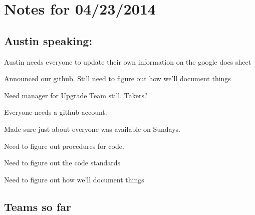 \section*{Notes for 04/23/2014}

\subsection*{Austin speaking\+:}


\begin{DoxyEnumerate}
\item Austin needs everyone to update their own information on the google docs sheet
\item Announced our github. Still need to figure out how we'll document things
\item Need manager for Upgrade Team still. Takers?
\item Everyone needs a github account.
\item Made sure just about everyone was available on Sundays.
\item Need to figure out procedures for code.
\begin{DoxyItemize}
\item Need to figure out the code standards
\item Need to figure out how we'll document things
\end{DoxyItemize}
\end{DoxyEnumerate}

\subsection*{Teams so far}


